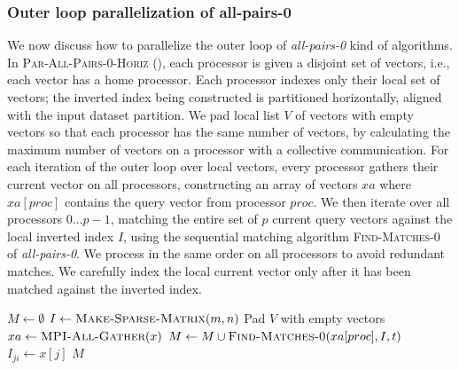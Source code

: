 \documentclass{comjnl}
\newcommand{\algo}[1]{\textsc{#1}} %
\newcommand{\var}[1]{\mbox{\textsl{#1}}} %
\begin{document}
\subsubsection{Outer loop parallelization of all-pairs-0}

We now discuss how to parallelize the outer loop of \var{all-pairs-0} kind
of algorithms.
In \algo{Par-All-Pairs-0-Horiz}
(), each processor is given a
disjoint set of vectors, i.e., each vector has a home processor.  Each
processor indexes only their local set of vectors; the
inverted index being constructed is partitioned horizontally, 
aligned with the input dataset partition. We pad local list
$V$ of vectors with empty vectors so that each processor has the same
number of vectors, by calculating the maximum number of vectors on a
processor with a collective communication.
For each iteration of the outer loop over local vectors, 
every processor gathers their current vector on all processors,
constructing an array of vectors $xa$ where $xa[proc]$ contains the query
vector from processor $proc$. We then iterate over all processors
$0\ldots p-1$, matching the entire set of $p$ current
query vectors against the local inverted index $I$, using the sequential matching
algorithm \algo{Find-Matches-0} of \var{all-pairs-0}. We process in the same
order on all processors to avoid redundant matches. We carefully index
the local current vector only after it has been matched against the
inverted index.


\begin{algorithm}
  \caption{$\algo{Par-All-Pairs-0-Horiz}(V,t)$}
  \label{alg:par-all-pairs-0-horiz}
  \begin{algorithmic}
    \STATE $M \gets \emptyset$
    \STATE $I \gets
    \algo{Make-Sparse-Matrix}(m, n)$ 
    \STATE Pad $V$ with empty vectors
      \STATE $xa \gets \algo{MPI-All-Gather}(x)$
        \STATE $M \gets M \cup 
        \algo{Find-Matches-0}(xa[proc], I, t)$ 
            \STATE $I_{ji} \gets x[j]$
          \ENDFOR
        \ENDIF
      \ENDFOR
    \ENDFOR
    \RETURN $M$
  \end{algorithmic}
\end{algorithm}

\end{document}
